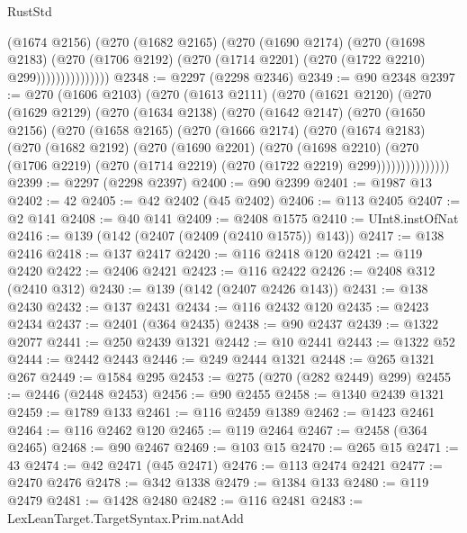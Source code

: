 \begin{lexlean}{RustStd}
\begin{coremodule}
                      (@1674 @2156)
                      (@270
                        (@1682 @2165)
                        (@270
                          (@1690 @2174)
                          (@270
                            (@1698 @2183)
                            (@270
                              (@1706 @2192)
                              (@270 (@1714 @2201) (@270 (@1722 @2210) @299)))))))))))))))
@2348 := @2297 (@2298 @2346)
@2349 := @90 @2348
@2397 := @270
    (@1606 @2103)
    (@270
      (@1613 @2111)
      (@270
        (@1621 @2120)
        (@270
          (@1629 @2129)
          (@270
            (@1634 @2138)
            (@270
              (@1642 @2147)
              (@270
                (@1650 @2156)
                (@270
                  (@1658 @2165)
                  (@270
                    (@1666 @2174)
                    (@270
                      (@1674 @2183)
                      (@270
                        (@1682 @2192)
                        (@270
                          (@1690 @2201)
                          (@270
                            (@1698 @2210)
                            (@270
                              (@1706 @2219)
                              (@270 (@1714 @2219) (@270 (@1722 @2219) @299)))))))))))))))
@2399 := @2297 (@2298 @2397)
@2400 := @90 @2399
@2401 := @1987 @13
@2402 := 42
@2405 := @42 @2402 (@45 @2402)
@2406 := @113 @2405
@2407 := @2 @141
@2408 := @40 @141
@2409 := @2408 @1575
@2410 := UInt8.instOfNat
@2416 := @139 (@142 (@2407 (@2409 (@2410 @1575)) @143))
@2417 := @138 @2416
@2418 := @137 @2417
@2420 := @116 @2418 @120
@2421 := @119 @2420
@2422 := @2406 @2421
@2423 := @116 @2422
@2426 := @2408 @312 (@2410 @312)
@2430 := @139 (@142 (@2407 @2426 @143))
@2431 := @138 @2430
@2432 := @137 @2431
@2434 := @116 @2432 @120
@2435 := @2423 @2434
@2437 := @2401 (@364 @2435)
@2438 := @90 @2437
@2439 := @1322 @2077
@2441 := @250 @2439 @1321
@2442 := @10 @2441
@2443 := @1322 @52
@2444 := @2442 @2443
@2446 := @249 @2444 @1321
@2448 := @265 @1321 @267
@2449 := @1584 @295
@2453 := @275 (@270 (@282 @2449) @299)
@2455 := @2446 (@2448 @2453)
@2456 := @90 @2455
@2458 := @1340 @2439 @1321
@2459 := @1789 @133
@2461 := @116 @2459 @1389
@2462 := @1423 @2461
@2464 := @116 @2462 @120
@2465 := @119 @2464
@2467 := @2458 (@364 @2465)
@2468 := @90 @2467
@2469 := @103 @15
@2470 := @265 @15
@2471 := 43
@2474 := @42 @2471 (@45 @2471)
@2476 := @113 @2474 @2421
@2477 := @2470 @2476
@2478 := @342 @1338
@2479 := @1384 @133
@2480 := @119 @2479
@2481 := @1428 @2480
@2482 := @116 @2481
@2483 := LexLeanTarget.TargetSyntax.Prim.natAdd

\end{coremodule}
\end{lexlean}
